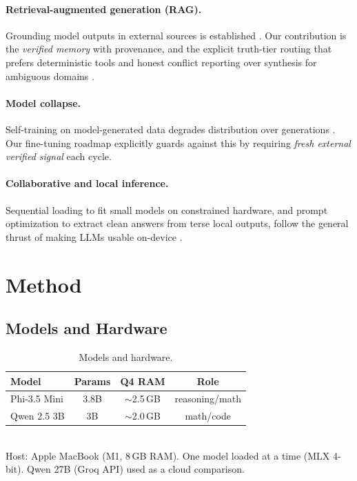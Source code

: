 \documentclass[10pt,twocolumn]{article}
\begin{document}
\paragraph{Retrieval-augmented generation (RAG).} Grounding model outputs in
external sources is established \cite{lewis2020retrieval}. Our contribution is
the \emph{verified memory} with provenance, and the explicit truth-tier routing
that prefers deterministic tools and honest conflict reporting over synthesis
for ambiguous domains \cite{gao2023retrieval}.

\paragraph{Model collapse.} Self-training on model-generated data degrades
distribution over generations \cite{shumailov2024curse}. Our fine-tuning
roadmap explicitly guards against this by requiring \emph{fresh external
verified signal} each cycle.

\paragraph{Collaborative and local inference.} Sequential loading to fit small
models on constrained hardware, and prompt optimization to extract clean
answers from terse local outputs, follow the general thrust of making LLMs
usable on-device \cite{mlx}.

\section{Method}
\subsection{Models and Hardware}
\begin{table}[t]
  \centering
  \small
  \caption{Models and hardware.}
  \label{tab:models}
  \begin{tabular}{@{}lccc@{}}
    \toprule
    Model & Params & Q4 RAM & Role \\
    \midrule
    Phi-3.5 Mini & 3.8B & $\sim$2.5\,GB & reasoning/math \\
    Qwen 2.5 3B  & 3B   & $\sim$2.0\,GB & math/code \\
    \bottomrule
  \end{tabular}
  \\[2mm]
  Host: Apple MacBook (M1, 8\,GB RAM). One model loaded at a time
  (MLX 4-bit). Qwen 27B (Groq API) used as a cloud comparison.
\end{table}
\end{document}
